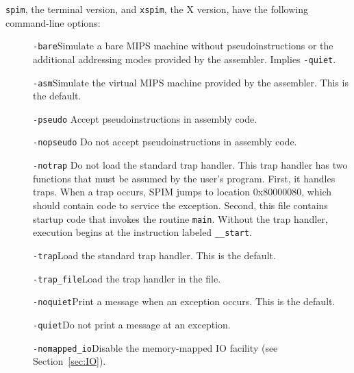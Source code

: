 \documentclass[11pt]{article}
\begin{document}
{\tt spim}, the terminal version, and {\tt xspim}, the X version, have
the following command-line options:
\begin{description}
  \item [] {\tt -bare}\newline Simulate a bare MIPS machine without
pseudoinstructions or the additional addressing modes provided by the
assembler.  Implies {\tt -quiet}.

  \item [] {\tt -asm}\newline Simulate the virtual MIPS machine
provided by the assembler.  This is the default.

  \item [] {\tt -pseudo} \newline Accept pseudoinstructions in assembly
code. 

  \item [] {\tt -nopseudo} \newline Do not accept pseudoinstructions in
assembly code. 

  \item [] {\tt -notrap} \newline Do not load the standard trap
handler.  This trap handler has two functions that must be assumed by
the user's program.  First, it handles traps.  When a trap occurs,
SPIM jumps to location 0x80000080, which should contain code to
service the exception.  Second, this file contains startup code that
invokes the routine {\tt main}.  Without the trap handler, execution
begins at the instruction labeled {\tt \_\_start}.

  \item [] {\tt -trap}\newline Load the standard trap handler.  This
is the default.

  \item [] {\tt -trap\_file}\newline Load the trap handler in the file.

  \item [] {\tt -noquiet}\newline Print a message when an exception
occurs.  This is the default.

  \item [] {\tt -quiet}\newline Do not print a message at an
exception.

  \item [] {\tt -nomapped\_io}\newline Disable the memory-mapped IO
facility (see Section~\ref{sec:IO}).


\end{description}
\end{document}
